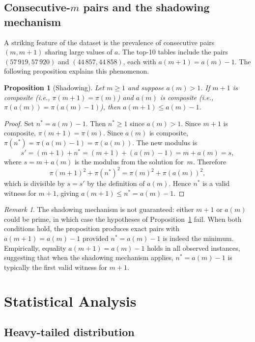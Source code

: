 \documentclass[11pt]{article}
\newtheorem{proposition}{Proposition}
\theoremstyle{definition}
\theoremstyle{remark}
\newtheorem{remark}{Remark}
\numberwithin{equation}{section}
\begin{document}
\subsection{Consecutive-\texorpdfstring{$m$}{m} pairs and the shadowing mechanism}

A striking feature of the dataset is the prevalence of consecutive
pairs $(m, m+1)$ sharing large values of $a$.  The top-10 tables
include the pairs $(57\,919, 57\,920)$ and $(44\,857, 44\,858)$,
each with $a(m+1) = a(m) - 1$.  The following proposition
explains this phenomenon.

\begin{proposition}[Shadowing]\label{prop:shadowing}
Let $m \ge 1$ and suppose $a(m) > 1$.
If $m + 1$ is composite \textup{(}i.e., $\pi(m+1) = \pi(m)$\textup{)}
and $a(m)$ is composite \textup{(}i.e., $\pi(a(m)) = \pi(a(m)-1)$\textup{)},
then $a(m+1) \le a(m) - 1$.
\end{proposition}

\begin{proof}
Set $n^* = a(m) - 1$.  Then $n^* \ge 1$ since $a(m) > 1$.
Since $m + 1$ is composite, $\pi(m+1) = \pi(m)$.
Since $a(m)$ is composite, $\pi(n^*) = \pi(a(m) - 1) = \pi(a(m))$.
The new modulus is
\[
s' = (m+1) + n^* = (m+1) + (a(m) - 1) = m + a(m) = s,
\]
where $s = m + a(m)$ is the modulus from the solution for~$m$.
Therefore
\[
\pi(m+1)^2 + \pi(n^*)^2 = \pi(m)^2 + \pi(a(m))^2,
\]
which is divisible by $s = s'$ by the definition of $a(m)$.
Hence $n^*$ is a valid witness for $m + 1$, giving
$a(m+1) \le n^* = a(m) - 1$.
\end{proof}

\begin{remark}
The shadowing mechanism is not guaranteed: either $m+1$ or $a(m)$
could be prime, in which case the hypotheses of
Proposition~\textup{\ref{prop:shadowing}} fail.
When both conditions hold, the proposition produces exact pairs
with $a(m+1) = a(m) - 1$ provided $n^* = a(m) - 1$ is indeed
the minimum.
Empirically, equality $a(m+1) = a(m) - 1$ holds in all observed
instances, suggesting that when the shadowing mechanism applies,
$n^* = a(m) - 1$ is typically the first valid witness for $m+1$.
\end{remark}

\section{Statistical Analysis}
\label{sec:statistics}

\subsection{Heavy-tailed distribution}
\end{document}
